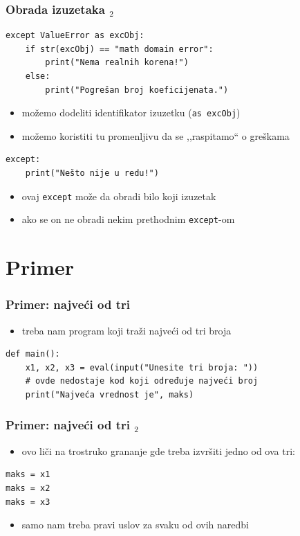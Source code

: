 \documentclass[utf8,compress,aspectratio=169]{beamer}
\begin{document}
\begin{frame}[fragile]
  \frametitle{Obrada izuzetaka $_2$}
\begin{verbatim}
except ValueError as excObj:
    if str(excObj) == "math domain error":
        print("Nema realnih korena!")
    else:
        print("Pogrešan broj koeficijenata.")
\end{verbatim}
  \begin{itemize}
    \item možemo dodeliti identifikator izuzetku (\texttt{as excObj})
    \item možemo koristiti tu promenljivu da se ,,raspitamo`` o greškama
  \end{itemize}
\begin{verbatim}
except:
    print("Nešto nije u redu!")
\end{verbatim}
  \begin{itemize}
    \item ovaj \texttt{except} može da obradi bilo koji izuzetak
    \item ako se on ne obradi nekim prethodnim \texttt{except}-om
  \end{itemize}
\end{frame}

\section{Primer}

\begin{frame}[fragile]
  \frametitle{Primer: najveći od tri}
  \begin{itemize}
    \item treba nam program koji traži najveći od tri broja
  \end{itemize}
\begin{verbatim}
def main():
    x1, x2, x3 = eval(input("Unesite tri broja: "))
    # ovde nedostaje kod koji određuje najveći broj
    print("Najveća vrednost je", maks)
\end{verbatim}
\end{frame}

\begin{frame}[fragile]
  \frametitle{Primer: najveći od tri $_2$}
  \begin{itemize}
    \item ovo liči na trostruko grananje gde treba izvršiti jedno od ova tri:
  \end{itemize}
\begin{verbatim}
maks = x1
maks = x2
maks = x3
\end{verbatim}
  \begin{itemize}
    \item samo nam treba pravi uslov za svaku od ovih naredbi
  \end{itemize}
\end{frame}
\end{document}
